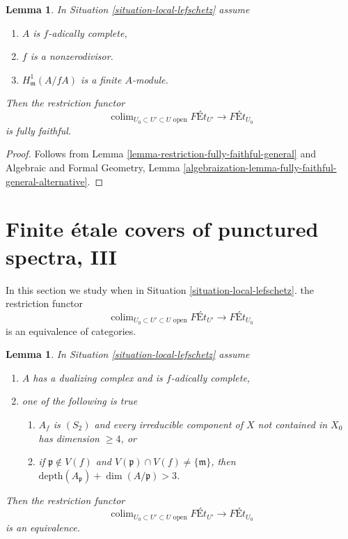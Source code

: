 \documentclass{stacks-project}
\theoremstyle{plain}
\newtheorem{lemma}[subsection]{Lemma}
\theoremstyle{definition}
\theoremstyle{remark}
\numberwithin{equation}{subsection}
\def\colim{\mathop{\mathrm{colim}}\nolimits}
\begin{document}
\begin{lemma}
\label{lemma-fully-faithful-general}
In Situation \ref{situation-local-lefschetz} assume
\begin{enumerate}
\item $A$ is $f$-adically complete,
\item $f$ is a nonzerodivisor.
\item $H^1_\mathfrak m(A/fA)$ is a finite $A$-module.
\end{enumerate}
Then the restriction functor
$$
\colim_{U_0 \subset U' \subset U\text{ open}} \textit{F\'Et}_{U'}
\longrightarrow
\textit{F\'Et}_{U_0}
$$
is fully faithful.
\end{lemma}

\begin{proof}
Follows from
Lemma \ref{lemma-restriction-fully-faithful-general} and
Algebraic and Formal Geometry, Lemma
\ref{algebraization-lemma-fully-faithful-general-alternative}.
\end{proof}








\section{Finite \'etale covers of punctured spectra, III}
\label{section-pi1-punctured-spec-III}

\noindent
In this section we study when in Situation \ref{situation-local-lefschetz}.
the restriction functor
$$
\colim_{U_0 \subset U' \subset U\text{ open}} \textit{F\'Et}_{U'}
\longrightarrow
\textit{F\'Et}_{U_0}
$$
is an equivalence of categories.

\begin{lemma}
\label{lemma-essentially-surjective-general-better}
In Situation \ref{situation-local-lefschetz} assume
\begin{enumerate}
\item $A$ has a dualizing complex and is $f$-adically complete,
\item one of the following is true
\begin{enumerate}
\item $A_f$ is $(S_2)$ and every irreducible component of $X$
not contained in $X_0$ has dimension $\geq 4$, or
\item if $\mathfrak p \not \in V(f)$ and
$V(\mathfrak p) \cap V(f) \not = \{\mathfrak m\}$, then
$\text{depth}(A_\mathfrak p) + \dim(A/\mathfrak p) > 3$.
\end{enumerate}
\end{enumerate}
Then the restriction functor
$$
\colim_{U_0 \subset U' \subset U\text{ open}} \textit{F\'Et}_{U'}
\longrightarrow
\textit{F\'Et}_{U_0}
$$
is an equivalence.
\end{lemma}
\end{document}
